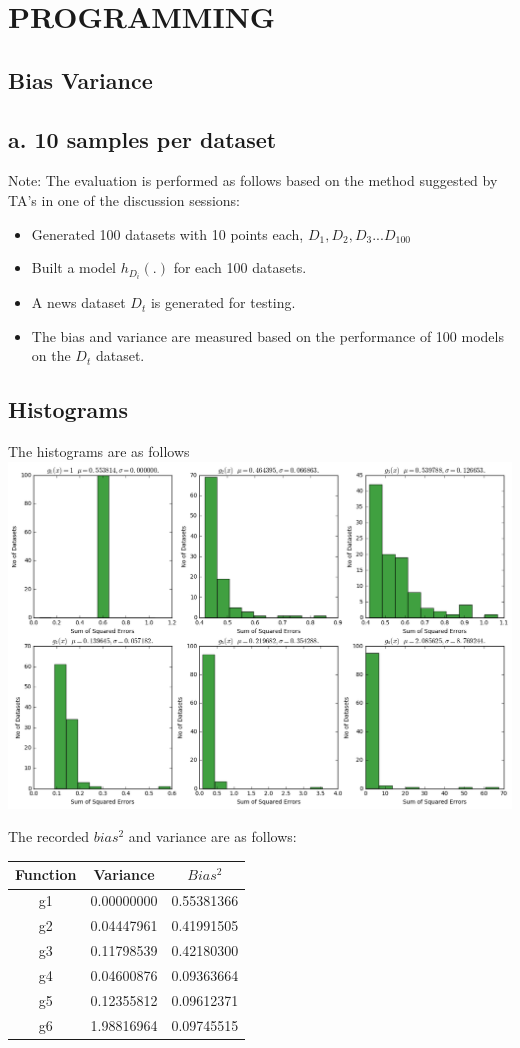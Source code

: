 \documentclass[letterpaper,doc,notimes]{apa6}
\begin{document}
\section{PROGRAMMING}
\subsection{Bias Variance}
\subsection{a. 10 samples per dataset}
Note:
  The evaluation is performed as follows based on the method suggested by TA's in one of the discussion sessions:
  \begin{itemize}
	\item Generated 100 datasets with 10 points each, $D_1, D_2, D_3... D_{100}$
	\item Built a model $h_{D_i}(.)$ for each 100 datasets.
	\item A news dataset $D_t$ is generated  for testing. 
	\item The bias and variance are measured based on the performance of 100 models on the $D_t$ dataset. 
  \end{itemize}
\subsection{Histograms}
The histograms are as follows \\
\includegraphics[width=1.0\textwidth]{hist_10samples}

The recorded $bias^2$ and variance are as follows:

\begin{tabular}{|c|c|c|} \hline
	Function & Variance      & $Bias^2$ \\ \hline
g1		& 0.00000000		& 0.55381366 \\
g2		& 0.04447961		& 0.41991505 \\
g3		& 0.11798539		& 0.42180300 \\
g4		 &0.04600876		& 0.09363664 \\
g5		 &0.12355812		& 0.09612371 \\
g6		 &1.98816964		& 0.09745515\\ \hline
\end{tabular}
\end{document}
